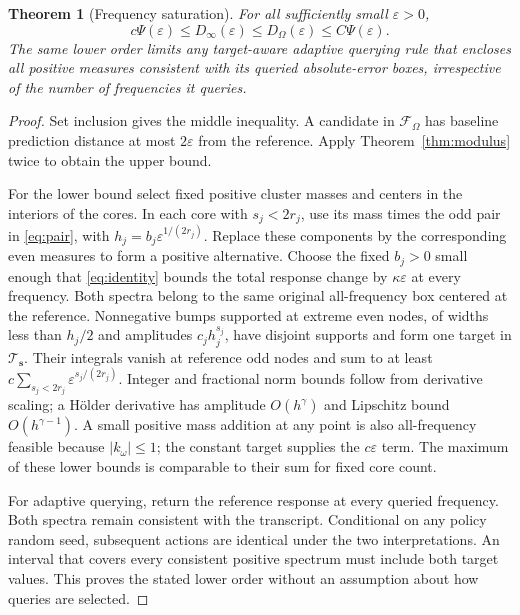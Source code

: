 \documentclass[10pt]{amsart}
\newtheorem{theorem}{Theorem}[section]
\theoremstyle{definition}
\theoremstyle{remark}
\newcommand{\eps}{\varepsilon}
\newcommand{\F}{\mathcal F}
\newcommand{\Tclass}{\mathcal T_{\boldsymbol s}}
\begin{document}
\begin{theorem}[Frequency saturation]\label{thm:saturation}
For all sufficiently small $\eps>0$,
\begin{equation}\label{eq:saturation}
 c\Psi(\eps)\le D_\infty(\eps)\le D_\Omega(\eps)\le C\Psi(\eps).
\end{equation}
The same lower order limits any target-aware adaptive querying rule that encloses all positive measures consistent with its queried absolute-error boxes, irrespective of the number of frequencies it queries.
\end{theorem}
\begin{proof}
Set inclusion gives the middle inequality. A candidate in $\F_\Omega$ has baseline prediction distance at most $2\eps$ from the reference. Apply Theorem~\ref{thm:modulus} twice to obtain the upper bound.

For the lower bound select fixed positive cluster masses and centers in the interiors of the cores. In each core with $s_j<2r_j$, use its mass times the odd pair in \eqref{eq:pair}, with $h_j=b_j\eps^{1/(2r_j)}$. Replace these components by the corresponding even measures to form a positive alternative. Choose the fixed $b_j>0$ small enough that \eqref{eq:identity} bounds the total response change by $\kappa\eps$ at every frequency. Both spectra belong to the same original all-frequency box centered at the reference. Nonnegative bumps supported at extreme even nodes, of widths less than $h_j/2$ and amplitudes $c_jh_j^{s_j}$, have disjoint supports and form one target in $\Tclass$. Their integrals vanish at reference odd nodes and sum to at least $c\sum_{s_j<2r_j}\eps^{s_j/(2r_j)}$. Integer and fractional norm bounds follow from derivative scaling; a H\"older derivative has amplitude $O(h^\gamma)$ and Lipschitz bound $O(h^{\gamma-1})$. A small positive mass addition at any point is also all-frequency feasible because $|k_\omega|\le1$; the constant target supplies the $c\eps$ term. The maximum of these lower bounds is comparable to their sum for fixed core count.

For adaptive querying, return the reference response at every queried frequency. Both spectra remain consistent with the transcript. Conditional on any policy random seed, subsequent actions are identical under the two interpretations. An interval that covers every consistent positive spectrum must include both target values. This proves the stated lower order without an assumption about how queries are selected.
\end{proof}
\end{document}
